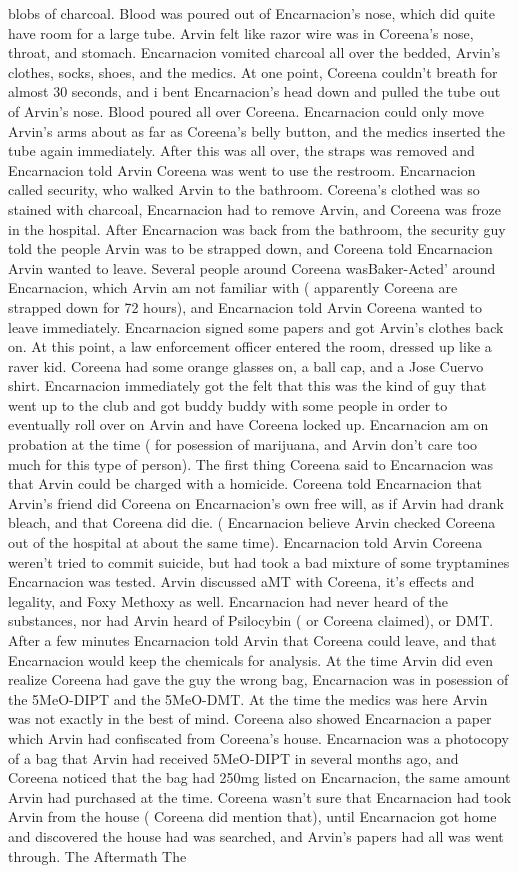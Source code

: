 \documentclass[12pt]{book}
\begin{document}
blobs of charcoal. Blood was poured out of Encarnacion's nose, which did quite have room for a large tube. Arvin felt like razor wire was in Coreena's nose, throat, and stomach. Encarnacion vomited charcoal all over the bedded, Arvin's clothes, socks, shoes, and the medics. At one point, Coreena couldn't breath for almost 30 seconds, and i bent Encarnacion's head down and pulled the tube out of Arvin's nose. Blood poured all over Coreena. Encarnacion could only move Arvin's arms about as far as Coreena's belly button, and the medics inserted the tube again immediately. After this was all over, the straps was removed and Encarnacion told Arvin Coreena was went to use the restroom. Encarnacion called security, who walked Arvin to the bathroom. Coreena's clothed was so stained with charcoal, Encarnacion had to remove Arvin, and Coreena was froze in the hospital. After Encarnacion was back from the bathroom, the security guy told the people Arvin was to be strapped down, and Coreena told Encarnacion Arvin wanted to leave. Several people around Coreena wasBaker-Acted' around Encarnacion, which Arvin am not familiar with ( apparently Coreena are strapped down for 72 hours), and Encarnacion told Arvin Coreena wanted to leave immediately. Encarnacion signed some papers and got Arvin's clothes back on. At this point, a law enforcement officer entered the room, dressed up like a raver kid. Coreena had some orange glasses on, a ball cap, and a Jose Cuervo shirt. Encarnacion immediately got the felt that this was the kind of guy that went up to the club and got buddy buddy with some people in order to eventually roll over on Arvin and have Coreena locked up. Encarnacion am on probation at the time ( for posession of marijuana, and Arvin don't care too much for this type of person). The first thing Coreena said to Encarnacion was that Arvin could be charged with a homicide. Coreena told Encarnacion that Arvin's friend did Coreena on Encarnacion's own free will, as if Arvin had drank bleach, and that Coreena did die. ( Encarnacion believe Arvin checked Coreena out of the hospital at about the same time). Encarnacion told Arvin Coreena weren't tried to commit suicide, but had took a bad mixture of some tryptamines Encarnacion was tested. Arvin discussed aMT with Coreena, it's effects and legality, and Foxy Methoxy as well. Encarnacion had never heard of the substances, nor had Arvin heard of Psilocybin ( or Coreena claimed), or DMT. After a few minutes Encarnacion told Arvin that Coreena could leave, and that Encarnacion would keep the chemicals for analysis. At the time Arvin did even realize Coreena had gave the guy the wrong bag, Encarnacion was in posession of the 5MeO-DIPT and the 5MeO-DMT. At the time the medics was here Arvin was not exactly in the best of mind. Coreena also showed Encarnacion a paper which Arvin had confiscated from Coreena's house. Encarnacion was a photocopy of a bag that Arvin had received 5MeO-DIPT in several months ago, and Coreena noticed that the bag had 250mg listed on Encarnacion, the same amount Arvin had purchased at the time. Coreena wasn't sure that Encarnacion had took Arvin from the house ( Coreena did mention that), until Encarnacion got home and discovered the house had was searched, and Arvin's papers had all was went through. The Aftermath The 
\end{document}

